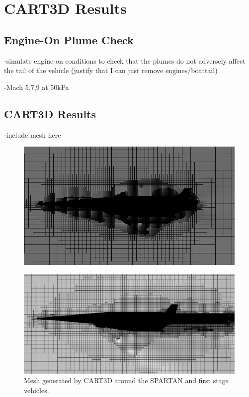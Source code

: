 
\chapter{CART3D Results}

\section{Engine-On Plume Check}
-simulate engine-on conditions to check that the plumes do not adversely affect the tail of the vehicle (justify that I can just remove engines/boattail)

-Mach 5,7,9 at 50kPa

\section{CART3D Results}
-include mesh here

\begin{figure}
	\centering
	\includegraphics[width=0.7\linewidth]{figures/3_vehicle_design/M3AoA6GRID}
	\caption{}
	\label{fig:M3AoA6GRID}
\end{figure}

		\begin{figure}
			\centering
			\includegraphics[width=0.7\linewidth]{figures/3_vehicle_design/CARTmesh}
			\caption{ Mesh generated by CART3D around the SPARTAN and first stage vehicles.}
			\label{fig:CARTmesh}
		\end{figure}
